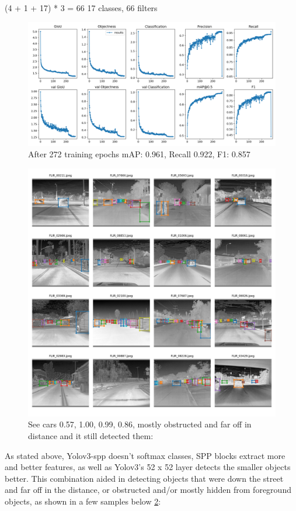 \documentclass[oneside]{article}
\begin{document}
(4 + 1 + 17) * 3 = 66
17 classes, 66 filters
\begin{figure}
\centering
\includegraphics[width=0.7\linewidth]{images/results-f1}
\caption{After 272 training epochs  mAP: 0.961, Recall 0.922, F1: 0.857}
\label{fig:results-f1}
\end{figure}

\begin{figure}
\centering
\includegraphics[width=0.7\linewidth]{images/results-f2}
\caption{See cars 0.57, 1.00, 0.99, 0.86, mostly obstructed and far off in distance and it still detected them:
}
\label{fig:results-f2}
\end{figure}
As stated above, Yolov3-spp doesn't softmax classes, SPP blocks extract more and better features, as well as Yolov3’s 52 x 52 layer detects the smaller objects better. This combination aided in detecting objects that were down the street and far off in the distance, or obstructed and/or mostly hidden from foreground objects,
as shown in a few samples below \ref{fig:results-f2}:
\end{document}
